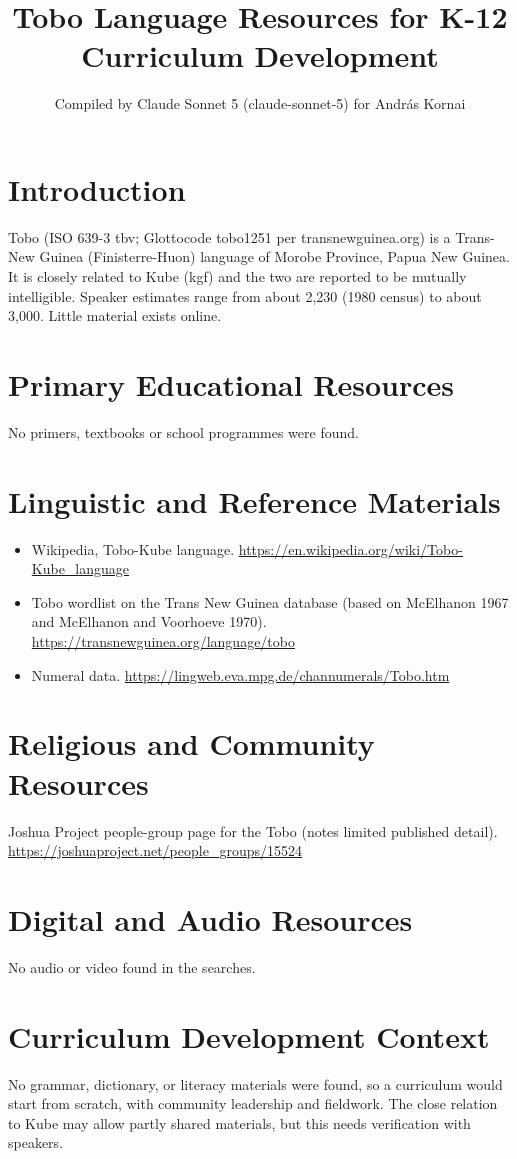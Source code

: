 \documentclass[12pt]{article}
\title{Tobo Language Resources for K-12 Curriculum Development}
\author{Compiled by Claude Sonnet 5 (claude-sonnet-5) for Andr\'as Kornai}
\date{}
\begin{document}
\maketitle
\section{Introduction}
Tobo (ISO 639-3 tbv; Glottocode tobo1251 per transnewguinea.org) is a Trans-New Guinea (Finisterre-Huon) language of Morobe Province, Papua New Guinea. It is closely related to Kube (kgf) and the two are reported to be mutually intelligible. Speaker estimates range from about 2,230 (1980 census) to about 3,000. Little material exists online.
\section{Primary Educational Resources}
No primers, textbooks or school programmes were found.
\section{Linguistic and Reference Materials}
\begin{itemize}
\item Wikipedia, Tobo-Kube language. \url{https://en.wikipedia.org/wiki/Tobo-Kube_language}
\item Tobo wordlist on the Trans New Guinea database (based on McElhanon 1967 and McElhanon and Voorhoeve 1970). \url{https://transnewguinea.org/language/tobo}
\item Numeral data. \url{https://lingweb.eva.mpg.de/channumerals/Tobo.htm}
\end{itemize}
\section{Religious and Community Resources}
Joshua Project people-group page for the Tobo (notes limited published detail). \url{https://joshuaproject.net/people_groups/15524}
\section{Digital and Audio Resources}
No audio or video found in the searches.
\section{Curriculum Development Context}
No grammar, dictionary, or literacy materials were found, so a curriculum would start from scratch, with community leadership and fieldwork. The close relation to Kube may allow partly shared materials, but this needs verification with speakers.
\end{document}

